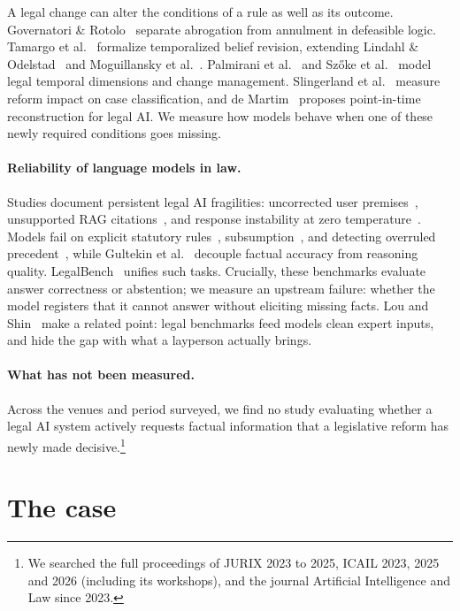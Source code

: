 \documentclass{IOS-Book-Article}
\begin{document}
A legal change can alter the conditions of a rule as well as its outcome. Governatori \& Rotolo~\cite{governatori2010} separate abrogation from annulment in defeasible logic. Tamargo et al.~\cite{tamargo2019} formalize temporalized belief revision, extending Lindahl \& Odelstad~\cite{lindahl2003} and Moguillansky et al.~\cite{moguillansky2024}. Palmirani et al.~\cite{palmirani2010,palmirani2009} and Sz\H{o}ke et al.~\cite{szoke2012} model legal temporal dimensions and change management. Slingerland et al.~\cite{slingerland2018} measure reform impact on case classification, and de Martim~\cite{demartim2025} proposes point-in-time reconstruction for legal AI. We measure how models behave when one of these newly required conditions goes missing.

\paragraph{Reliability of language models in law.}

Studies document persistent legal AI fragilities: uncorrected user premises~\cite{dahl2024}, unsupported RAG citations~\cite{magesh2025}, and response instability at zero temperature~\cite{blairstanek2025}. Models fail on explicit statutory rules~\cite{blairstanek2023}, subsumption~\cite{wardas2025}, and detecting overruled precedent~\cite{zhang2025}, while Gultekin et al.~\cite{gultekin2025} decouple factual accuracy from reasoning quality. LegalBench~\cite{legalbench} unifies such tasks. Crucially, these benchmarks evaluate answer correctness or abstention; we measure an upstream failure: whether the model registers that it cannot answer without eliciting missing facts. Lou and Shin~\cite{lou2026} make a related point: legal benchmarks feed models clean expert inputs, and hide the gap with what a layperson actually brings.

\paragraph{What has not been measured.}

Across the venues and period surveyed, we find no study evaluating whether a legal AI system actively requests factual information that a legislative reform has newly made decisive.\footnote{We searched the full proceedings of JURIX 2023 to 2025, ICAIL 2023, 2025 and 2026 (including its workshops), and the journal Artificial Intelligence and Law since 2023.}

\section{The case}
\end{document}
